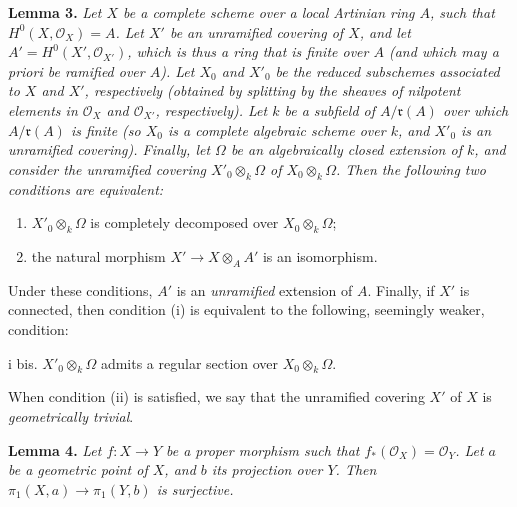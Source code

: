 \documentclass{article}
\providecommand{\tightlist}{%
  \setlength{\itemsep}{0pt}\setlength{\parskip}{0pt}}
\newenvironment{itenv}[1]
  {\phantomsection\par\smallskip\noindent\textbf{#1.}\itshape}
  {\par\smallskip}
\newcommand{\oldpage}[1]{\marginpar{\footnotesize$\Big\vert$ \textit{p.~#1}}}
\theoremstyle{definition}
\theoremstyle{definition}
\theoremstyle{definition}
\theoremstyle{definition}
\theoremstyle{remark}
\begin{document}
\leavevmode{}%
\begin{itenv}{Lemma 3}
Let \(X\) be a complete scheme over a local Artinian ring \(A\), such that \(H^0(X,{\mathscr{O}}_X)=A\).
Let \(X'\) be an unramified covering of \(X\), and let \(A'=H^0(X',{\mathscr{O}}_{X'})\), which is thus a ring that is finite over \(A\) (and which may a priori be ramified over \(A\)).
Let \(X_0\) and \(X'_0\) be the reduced subschemes associated to \(X\) and \(X'\), respectively (obtained by splitting by the sheaves of nilpotent elements in \({\mathscr{O}}_X\) and \({\mathscr{O}}_{X'}\), respectively).
Let \(k\) be a subfield of \(A/{\mathfrak{r}}(A)\) over which \(A/{\mathfrak{r}}(A)\) is finite (so \(X_0\) is a complete algebraic scheme over \(k\), and \(X'_0\) is an unramified covering).
Finally, let \(\Omega\) be an algebraically closed extension of \(k\), and consider the unramified covering \(X'_0\otimes_k\Omega\) of \(X_0\otimes_k\Omega\).
\oldpage{182-20}Then the following two conditions are equivalent:

\begin{enumerate}
\def\labelenumi{\roman{enumi}.}
\tightlist
\item
  \(X'_0\otimes_k\Omega\) is completely decomposed over \(X_0\otimes_k\Omega\);
\item
  the natural morphism \(X'\to X\otimes_AA'\) is an isomorphism.
\end{enumerate}

Under these conditions, \(A'\) is an \emph{unramified} extension of \(A\).
Finally, if \(X'\) is connected, then condition (i) is equivalent to the following, seemingly weaker, condition:

i bis. \(X'_0\otimes_k\Omega\) admits a regular section over \(X_0\otimes_k\Omega\).

\end{itenv}

When condition (ii) is satisfied, we say that the unramified covering \(X'\) of \(X\) is \emph{geometrically trivial}.

\leavevmode{}%
\begin{itenv}{Lemma 4}
Let \(f\colon X\to Y\) be a proper morphism such that \(f_*({\mathscr{O}}_X)={\mathscr{O}}_Y\).
Let \(a\) be a geometric point of \(X\), and \(b\) its projection over \(Y\).
Then \(\pi_1(X,a)\to\pi_1(Y,b)\) is \emph{surjective}.

\end{itenv}
\end{document}
